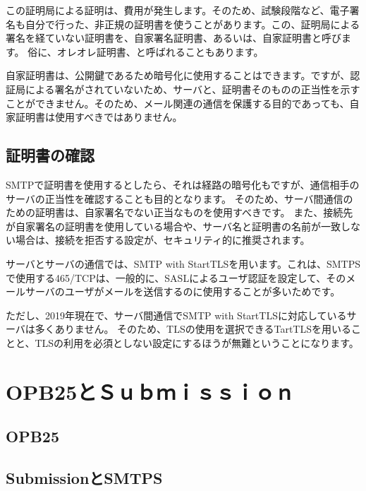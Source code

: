 この証明局による証明は、費用が発生します。そのため、試験段階など、電子署名も自分で行った、非正規の証明書を使うことがあります。この、証明局による署名を経ていない証明書を、自家署名証明書、あるいは、自家証明書と呼びます。
俗に、オレオレ証明書、と呼ばれることもあります。

自家証明書は、公開鍵であるため暗号化に使用することはできます。ですが、認証局による署名がされていないため、サーバと、証明書そのものの正当性を示すことができません。そのため、メール関連の通信を保護する目的であっても、自家証明書は使用すべきではありません。

\subsection{証明書の確認}

SMTPで証明書を使用するとしたら、それは経路の暗号化もですが、通信相手のサーバの正当性を確認することも目的となります。
そのため、サーバ間通信のための証明書は、自家署名でない正当なものを使用すべきです。
また、接続先が自家署名の証明書を使用している場合や、サーバ名と証明書の名前が一致しない場合は、接続を拒否する設定が、セキュリティ的に推奨されます。

サーバとサーバの通信では、SMTP with StartTLSを用います。これは、SMTPSで使用する465/TCPは、一般的に、SASLによるユーザ認証を設定して、そのメールサーバのユーザがメールを送信するのに使用することが多いためです。

ただし、2019年現在で、サーバ間通信でSMTP with StartTLSに対応しているサーバは多くありません。
そのため、TLSの使用を選択できるTartTLSを用いることと、TLSの利用を必須としない設定にするほうが無難ということになります。


\section{OPB25とＳｕｂｍｉｓｓｉｏｎ}

\subsection{OPB25}

\subsection{SubmissionとSMTPS}